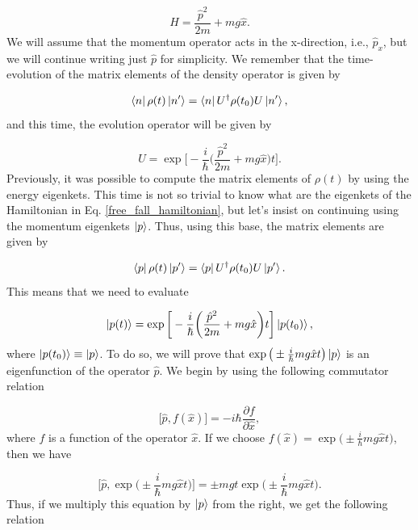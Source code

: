 \documentclass{article}
\begin{document}
\begin{equation}\label{free_fall_hamiltonian}
    H = \frac{\hat{p}^{2}}{2m} + mg\hat{x}.
\end{equation}
%
We will assume that the momentum operator acts in the x-direction, i.e., $\hat{p}_{x}$, but we will continue writing just $\hat{p}$ for simplicity. We remember that the time-evolution of the matrix elements of the density operator is given by

\begin{equation}
    \bra{n} \rho (t) \ket{n'} = \bra{n} U^{\dagger} \rho (t_{0}) U \ket{n'},
\end{equation}
%
and this time, the evolution operator will be given by

\begin{equation}
    U = \exp \bigg[-\frac{i}{\hbar} \bigg( \frac{\hat{p}^{2}}{2m} + mg\hat{x} \bigg) t \bigg].
\end{equation}
%
Previously, it was possible to compute the matrix elements of $\rho (t)$ by using the energy eigenkets. This time is not so trivial to know what are the eigenkets of the Hamiltonian in Eq. \ref{free_fall_hamiltonian}, but let's insist on continuing using the momentum eigenkets $\ket{p}$. Thus, using this base, the matrix elements are given by

\begin{equation}
    \bra{p} \rho (t) \ket{p'} = \bra{p} U^{\dagger} \rho (t_{0}) U \ket{p'}.
\end{equation}
%
This means that we need to evaluate

\begin{equation}
    \ket{p(t)} = \exp \bigg[-\frac{i}{\hbar} \bigg( \frac{\hat{p}^{2}}{2m} + mg\hat{x} \bigg) t \bigg] \ket{p(t_{0})}, 
\end{equation}
%
where $\ket{p(t_{0})} \equiv \ket{p}$. To do so, we will prove that $\exp \big(\pm \frac{i}{\hbar} mg \hat{x} t \big) \ket{p}$ is an eigenfunction of the operator $\hat{p}$. We begin by using the following commutator relation \cite{sakurai2017modern}

\begin{equation}
    \big[ \hat{p}, f(\hat{x}) \big] = -i \hbar \frac{\partial f}{\partial \hat{x}},
\end{equation}
%
where $f$ is a function of the operator $\hat{x}$. If we choose $f(\hat{x})= \exp \big(\pm \frac{i}{\hbar} mg \hat{x} t \big) $, then we have

\begin{equation}
    \bigg[ \hat{p}, \exp \bigg(\pm \frac{i}{\hbar} mg \hat{x} t \bigg) \bigg] = \pm mgt \exp \bigg(\pm \frac{i}{\hbar} mg \hat{x} t \bigg).
\end{equation}
%
Thus, if we multiply this equation by $\ket{p}$ from the right, we get the following relation
\end{document}
